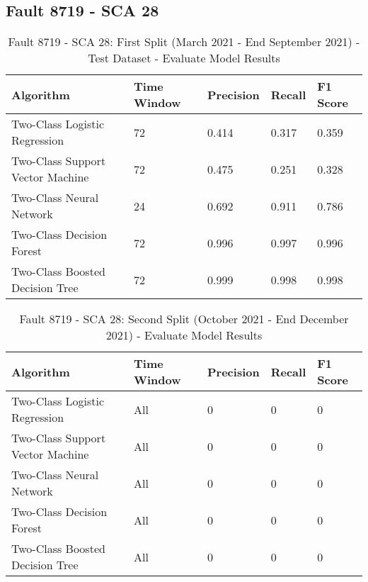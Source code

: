 \subsection{Fault 8719 - SCA 28}

\begin{table}[!ht]
    \centering
    \begin{tabular}{|l|l|l|l|l|}
    \hline
        Algorithm & Time Window & Precision & Recall & F1 Score \\ \hline
        Two-Class Logistic Regression & 72 & 0.414 & 0.317 & 0.359 \\ \hline
        Two-Class Support Vector Machine & 72 & 0.475 & 0.251 & 0.328 \\ \hline
        Two-Class Neural Network & 24 & 0.692 & 0.911 & 0.786 \\ \hline
        Two-Class Decision Forest & 72 & 0.996 & 0.997 & 0.996 \\ \hline
        Two-Class Boosted Decision Tree & 72 & 0.999 & 0.998 & 0.998 \\ \hline
    \end{tabular}
    \caption{Fault 8719 - SCA 28: First Split (March 2021 - End September 2021) - Test Dataset - Evaluate Model Results}
    \label{9112_SCA34_1st}
\end{table}

\begin{table}[!ht]
    \centering
    \begin{tabular}{|l|l|l|l|l|}
    \hline
        Algorithm & Time Window & Precision & Recall & F1 Score \\ \hline
        Two-Class Logistic Regression & All & 0 & 0 & 0 \\ \hline
        Two-Class Support Vector Machine & All & 0 & 0 & 0 \\ \hline
        Two-Class Neural Network & All & 0 & 0 & 0 \\ \hline
        Two-Class Decision Forest & All & 0 & 0 & 0 \\ \hline
        Two-Class Boosted Decision Tree & All & 0 & 0 & 0 \\ \hline
    \end{tabular}
    \caption{Fault 8719 - SCA 28: Second Split (October 2021 - End December 2021) - Evaluate Model Results}
    \label{9112_SCA34_1st}
\end{table}

